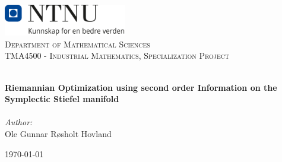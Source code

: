 
\begin{titlepage}
\vbox{ }
\vbox{ }
\begin{center}
\includegraphics[width=0.40\textwidth]{Images/NTNU_logo.png}\\[1cm]
\textsc{\LARGE Department of Mathematical Sciences}\\[1.5cm]
\textsc{\Large TMA4500 - Industrial Mathematics, Specialization Project }\\[0.5cm]
\vbox{ }

\HRule \\[0.4cm]
{ \huge \bfseries Riemannian Optimization using second order Information on the Symplectic Stiefel manifold}\\[0.4cm]
\HRule \\[1.5cm]

\large
\emph{Author:}\\
Ole Gunnar Røsholt Hovland
\vfill

{\large \today}
\end{center}
\end{titlepage}